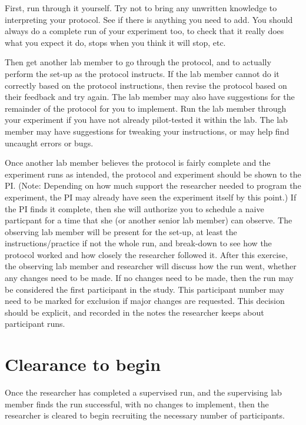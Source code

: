 \documentclass[
  12pt,
]{book}
\begin{document}
First, run through it yourself. Try not to bring any unwritten knowledge to interpreting your protocol. See if there is anything you need to add. You should always do a complete run of your experiment too, to check that it really does what you expect it do, stops when you think it will stop, etc.

Then get another lab member to go through the protocol, and to actually perform the set-up as the protocol instructs. If the lab member cannot do it correctly based on the protocol instructions, then revise the protocol based on their feedback and try again. The lab member may also have suggestions for the remainder of the protocol for you to implement. Run the lab member through your experiment if you have not already pilot-tested it within the lab. The lab member may have suggestions for tweaking your instructions, or may help find uncaught errors or bugs.

Once another lab member believes the protocol is fairly complete and the experiment runs as intended, the protocol and experiment should be shown to the PI. (Note: Depending on how much support the researcher needed to program the experiment, the PI may already have seen the experiment itself by this point.) If the PI finds it complete, then she will authorize you to schedule a naive particpant for a time that she (or another senior lab member) can observe. The observing lab member will be present for the set-up, at least the instructions/practice if not the whole run, and break-down to see how the protocol worked and how closely the researcher followed it. After this exercise, the observing lab member and researcher will discuss how the run went, whether any changes need to be made. If no changes need to be made, then the run may be considered the first participant in the study. This participant number may need to be marked for exclusion if major changes are requested. This decision should be explicit, and recorded in the notes the researcher keeps about participant runs.

\section{Clearance to begin}\label{clearance-to-begin}

Once the researcher has completed a supervised run, and the supervising lab member finds the run successful, with no changes to implement, then the researcher is cleared to begin recruiting the necessary number of participants.
\end{document}

